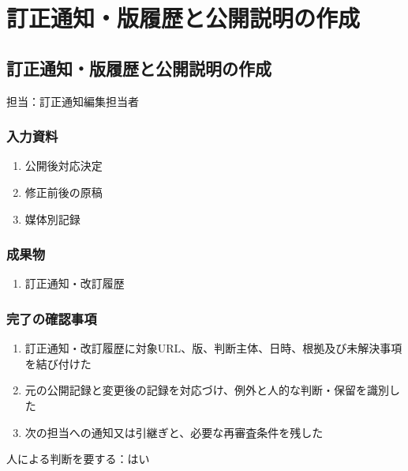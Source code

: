 \documentclass[a4paper,11pt]{article}
\begin{document}
\section{訂正通知・版履歴と公開説明の作成}
\subsection{訂正通知・版履歴と公開説明の作成}
\par 担当：訂正通知編集担当者\par\medskip
\subsubsection*{入力資料}
\begin{enumerate}[leftmargin=2em,itemsep=0.35em]
\item 公開後対応決定
\item 修正前後の原稿
\item 媒体別記録
\end{enumerate}
\subsubsection*{成果物}
\begin{enumerate}[leftmargin=2em,itemsep=0.35em]
\item 訂正通知・改訂履歴
\end{enumerate}
\subsubsection*{完了の確認事項}
\begin{enumerate}[leftmargin=2em,itemsep=0.35em]
\item 訂正通知・改訂履歴に対象URL、版、判断主体、日時、根拠及び未解決事項を結び付けた
\item 元の公開記録と変更後の記録を対応づけ、例外と人的な判断・保留を識別した
\item 次の担当への通知又は引継ぎと、必要な再審査条件を残した
\end{enumerate}
\par 人による判断を要する：はい\par\medskip
\end{document}
